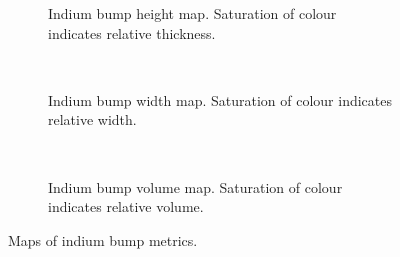 \begin{figure}
    \centering
\begin{subfigure}[t]{0.3\textwidth}
    \centering
    \tiny
    \caption{Indium bump height map. Saturation of colour indicates relative thickness.}
    \label{fig:bumpHeightMap}
\end{subfigure}
~
\begin{subfigure}[t]{0.3\textwidth}
    \centering
    \tiny
    \caption{Indium bump width map. Saturation of colour indicates relative width.}
    \label{fig:bumpWidthMap}
\end{subfigure}
~
\begin{subfigure}[t]{0.3\textwidth}
    \centering
    \tiny
    \caption{Indium bump volume map. Saturation of colour indicates relative volume.}
    \label{fig:bumpVolumeMap}
\end{subfigure}
\caption{Maps of indium bump metrics.}
\end{figure}

